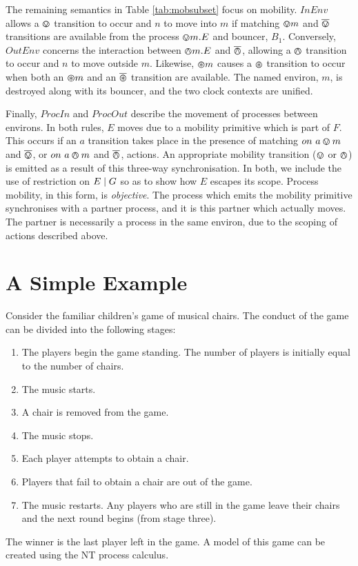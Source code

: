 The remaining semantics in Table \ref{tab:mobsubset} focus on
mobility.  $InEnv$ allows a $\varovee$ transition to occur and $n$ to move
into $m$ if matching $\varovee m$ and $\overline{\varovee}$ transitions are available
from the process $\varovee m.E$ and bouncer, $B_1$.  Conversely,
$OutEnv$ concerns the interaction between $\varowedge m.E$ and $\overline{\varowedge}$,
allowing a $\varowedge$ transition to occur and $n$ to move outside $m$.
Likewise, $\varoast m$ causes a $\varoast$ transition to occur when
both an $\varoast m$ and an $\overline{\varoast}$ transition are available.  The
named environ, $m$, is destroyed along with its bouncer, and the two
clock contexts are unified.

Finally, $ProcIn$ and $ProcOut$ describe the movement of processes
between environs.  In both rules, $E$ moves due to a mobility
primitive which is part of $F$.  This occurs if an $a$ transition
takes place in the presence of matching $on\ a \varovee m$ and $\overline{\varovee}$, or
$on\ a \varowedge m$ and $\overline{\varowedge}$, actions.  An appropriate mobility
transition ($\varovee$ or $\varowedge$) is emitted as a result of this
three-way synchronisation.  In both, we include the use of restriction
on $E \;|\; G$ so as to show how $E$ escapes its scope.  Process
mobility, in this form, is \emph{objective}.  The process which emits
the mobility primitive synchronises with a partner process, and it is
this partner which actually moves.  The partner is necessarily a
process in the same environ, due to the scoping of actions described
above.

\section{A Simple Example}
\label{example}

Consider the familiar children's game of musical chairs.  The conduct of
the game can be divided into the following stages:
\begin{enumerate}
\item The players begin the game standing.  The number of players is
initially equal to the number of chairs.
\item The music starts.
\item A chair is removed from the game.
\item The music stops.
\item Each player attempts to obtain a chair.
\item Players that fail to obtain a chair are out of the game.
\item The music restarts.  Any players who are still in the game leave
  their chairs and the next round begins (from stage three).
\end{enumerate}
The winner is the last player left in the game.  A model of
this game can be created using the NT process calculus.

